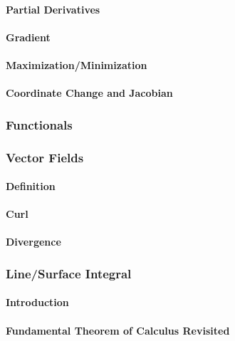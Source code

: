 \paragraph{Partial Derivatives} 
\paragraph{Gradient} 
\paragraph{Maximization/Minimization} 
\paragraph{Coordinate Change and Jacobian} 

\subsubsection{Functionals} 




\subsubsection{Vector Fields}

\paragraph{Definition} 

\paragraph{Curl}

\paragraph{Divergence}



\subsubsection{Line/Surface Integral} 

\paragraph{Introduction} 

\paragraph{Fundamental Theorem of Calculus Revisited}

